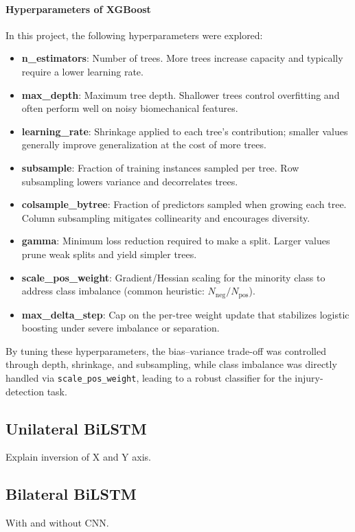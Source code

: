 \paragraph{Hyperparameters of XGBoost}
In this project, the following hyperparameters were explored:
\begin{itemize}
    \item \textbf{n\_estimators}: Number of trees. More trees increase capacity and typically require a lower learning rate.
    \item \textbf{max\_depth}: Maximum tree depth. Shallower trees control overfitting and often perform well on noisy biomechanical features.
    \item \textbf{learning\_rate}: Shrinkage applied to each tree's contribution; smaller values generally improve generalization at the cost of more trees.
    \item \textbf{subsample}: Fraction of training instances sampled per tree. Row subsampling lowers variance and decorrelates trees.
    \item \textbf{colsample\_bytree}: Fraction of predictors sampled when growing each tree. Column subsampling mitigates collinearity and encourages diversity.
    \item \textbf{gamma}: Minimum loss reduction required to make a split. Larger values prune weak splits and yield simpler trees.
    \item \textbf{scale\_pos\_weight}: Gradient/Hessian scaling for the minority class to address class imbalance (common heuristic: $N_{\text{neg}}/N_{\text{pos}}$).
    \item \textbf{max\_delta\_step}: Cap on the per-tree weight update that stabilizes logistic boosting under severe imbalance or separation.
\end{itemize}
By tuning these hyperparameters, the bias--variance trade-off was controlled through depth, shrinkage, and subsampling, while class imbalance was directly handled via \texttt{scale\_pos\_weight}, leading to a robust classifier for the injury-detection task.

\subsection{Unilateral BiLSTM}\label{subsec:method-unilat-bilstm}
Explain inversion of X and Y axis.
\subsection{Bilateral BiLSTM}\label{subsec:method-bilat-bilstm}
With and without CNN.
